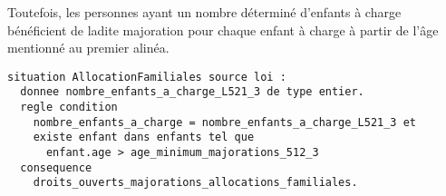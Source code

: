 \documentclass[11pt, french]{article}
\begin{document}
Toutefois, les personnes ayant un nombre déterminé d'enfants à charge bénéficient de ladite majoration pour chaque enfant à charge à partir de l'âge mentionné au premier alinéa.
\begin{lstlisting}
situation AllocationFamiliales source loi :
  donnee nombre_enfants_a_charge_L521_3 de type entier.
  regle condition
    nombre_enfants_a_charge = nombre_enfants_a_charge_L521_3 et
    existe enfant dans enfants tel que
      enfant.age > age_minimum_majorations_512_3
  consequence
    droits_ouverts_majorations_allocations_familiales.
\end{lstlisting}
\end{document}
